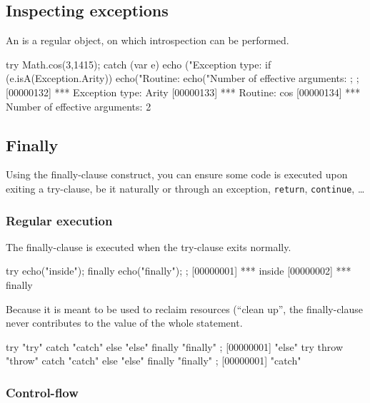\subsection{Inspecting exceptions}

An  is a regular object, on which introspection
can be performed.

\begin{urbiscript}
try
{
  Math.cos(3,1415);
}
catch (var e)
{
  echo ("Exception type: %
  if (e.isA(Exception.Arity))
  {
    echo("Routine: %
    echo("Number of effective arguments: %
  };
};
[00000132] *** Exception type: Arity
[00000133] *** Routine: cos
[00000134] *** Number of effective arguments: 2
\end{urbiscript}

\subsection{Finally}
\label{sec:lang:except:finally}

Using the finally-clause construct, you can ensure some code is executed
upon exiting a try-clause, be it naturally or through an exception,
\lstinline|return|, \lstinline|continue|, \ldots

\subsubsection{Regular execution}

The finally-clause is executed when the try-clause exits normally.

\begin{urbiscript}
try
{
  echo("inside");
}
finally
{
  echo("finally");
};
[00000001] *** inside
[00000002] *** finally
\end{urbiscript}

Because it is meant to be used to reclaim resources (``clean up'', the
finally-clause never contributes to the value of the whole statement.

\begin{urbiscript}
try { "try" } catch { "catch" } else { "else" } finally { "finally" };
[00000001] "else"
try { throw "throw" } catch { "catch" } else { "else" } finally { "finally" };
[00000001] "catch"
\end{urbiscript}


\subsubsection{Control-flow}

